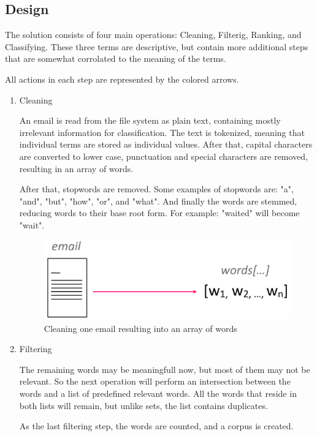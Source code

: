 \documentclass[a4paper]{article}
\begin{document}
\subsection{Design}

The solution consists of four main operations: Cleaning, Filterig, Ranking, and Classifying. These three terms are descriptive, but contain more additional steps that are somewhat corrolated to the meaning of the terms.

All actions in each step are represented by the colored arrows.

\begin{enumerate}
    \item Cleaning

    An email is read from the file system as plain text, containing mostly irrelevant information for classification. The text is tokenized, meaning that individual terms are stored as individual values. After that, capital characters are converted to lower case, punctuation and special characters are removed, resulting in an array of words.

    After that, stopwords are removed. Some examples of stopwords are: "a", "and", "but", "how", "or", and "what". And finally the words are stemmed, reducing words to their base root form. For example: "waited" will become "wait".

    \begin{figure}[ht!]
        \centering
        \includegraphics[width=.6\linewidth]{res/cleaning}
        \caption{Cleaning one email resulting into an array of words}
        \label{fig:sub1}
    \end{figure}

    \item Filtering

    The remaining words may be meaningfull now, but most of them may not be relevant. So the next operation will perform an intersection between the words and a list of predefined relevant words. All the words that reside in both lists will remain, but unlike sets, the list contains duplicates.

    As the last filtering step, the words are counted, and a corpus is created.


\end{enumerate}
\end{document}
